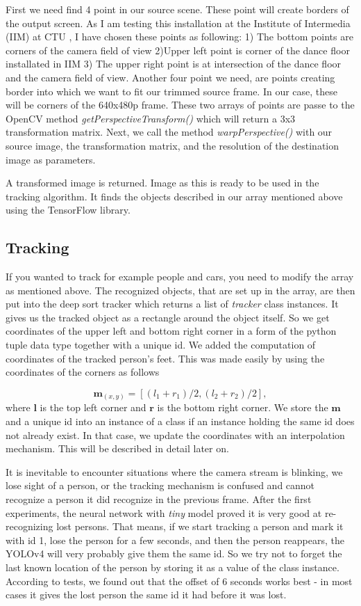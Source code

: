 \documentclass{ctuthesis}
\begin{document}
First we need find 4 point in our source scene. These point will create borders of the output screen. As I am testing this installation at the Institute of Intermedia (IIM) at CTU \cite{95}, I have chosen these points as following: 1) The bottom points are corners of the camera field of view 2)Upper left point is corner of the dance floor installated in IIM 3) The upper right point is at intersection of the dance floor and the camera field of view. Another four point we need, are points creating border into which we want to fit our trimmed source frame. In our case, these will be corners of the 640x480p frame. These two arrays of points are passe to the OpenCV method \textit{getPerspectiveTransform()} which will return a 3x3 transformation matrix. Next, we call the method \textit{warpPerspective()} with our source image, the transformation matrix, and the resolution of the destination image as parameters. 

A transformed image is returned. Image as this is ready to be used in the tracking algorithm. It finds the objects described in our array mentioned above using the TensorFlow library.

\subsection{Tracking} \label{tracking}
If you wanted to track for example people and cars, you need to modify the array as mentioned above. The recognized objects, that are set up in the array, are then put into the deep sort tracker which returns a list of \textit{tracker} class instances. It gives us the tracked object as a rectangle around the object itself. So we get coordinates of the upper left and bottom right corner in a form of the python tuple data type together with a unique id. We added the computation of coordinates of the tracked person's feet. This was made easily by using the coordinates of the corners as follows

\begin{equation}
\textbf{m}_{(x, y)} = [(l_1 + r_1)/2, (l_2 + r_2)/2],
\end{equation}
where \(\textbf{l}\) is the top left corner and \(\textbf{r}\) is the bottom right corner. We store the \(\textbf{m}\) and a unique id into an instance of a class if an instance holding the same id does not already exist. In that case, we update the coordinates with an interpolation mechanism. This will be described in detail later on.

It is inevitable to encounter situations where the camera stream is blinking, we lose sight of a person, or the tracking mechanism is confused and cannot recognize a person it did recognize in the previous frame. After the first experiments, the neural network with \textit{tiny} model proved it is very good at re-recognizing lost persons. That means, if we start tracking a person and mark it with id 1, lose the person for a few seconds, and then the person reappears, the YOLOv4 will very probably give them the same id. So we try not to forget the last known location of the person by storing it as a value of the class instance. According to tests, we found out that the offset of 6 seconds works best - in most cases it gives the lost person the same id it had before it was lost. 
\end{document}
